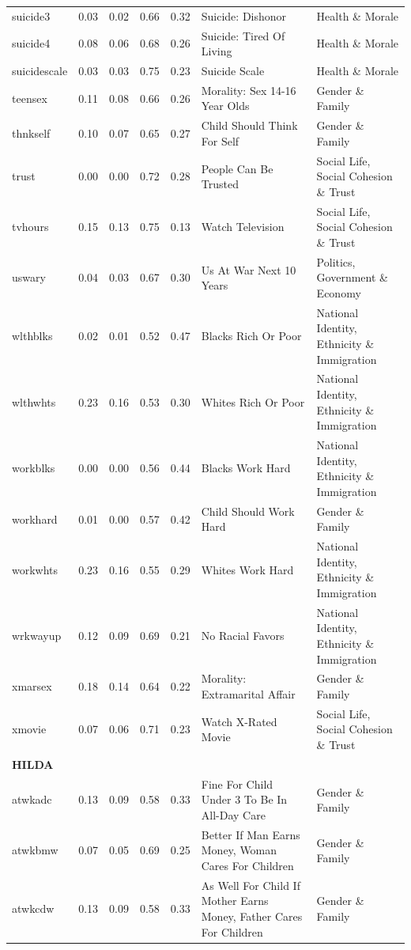 \documentclass[
  12pt,
]{article}
\begin{document}
\begin{landscape}
\begin{scriptsize}
\begin{longtable}{|p{1.75in}|p{0.3in}|p{0.3in}|p{0.3in}|p{0.3in}|p{2.5in}|p{2.5in}}
suicide3 & 0.03 & 0.02 & 0.66 & 0.32 & Suicide: Dishonor & Health \& Morale \\ 
suicide4 & 0.08 & 0.06 & 0.68 & 0.26 & Suicide: Tired Of Living & Health \& Morale \\ 
suicidescale & 0.03 & 0.03 & 0.75 & 0.23 & Suicide Scale & Health \& Morale \\ 
teensex & 0.11 & 0.08 & 0.66 & 0.26 & Morality: Sex 14-16 Year Olds & Gender \& Family \\ 
thnkself & 0.10 & 0.07 & 0.65 & 0.27 & Child Should Think For Self & Gender \& Family \\ 
trust & 0.00 & 0.00 & 0.72 & 0.28 & People Can Be Trusted & Social Life, Social Cohesion \& Trust \\ 
tvhours & 0.15 & 0.13 & 0.75 & 0.13 & Watch Television & Social Life, Social Cohesion \& Trust \\ 
uswary & 0.04 & 0.03 & 0.67 & 0.30 & Us At War Next 10 Years & Politics, Government \& Economy \\ 
wlthblks & 0.02 & 0.01 & 0.52 & 0.47 & Blacks Rich Or Poor & National Identity, Ethnicity \& Immigration \\ 
wlthwhts & 0.23 & 0.16 & 0.53 & 0.30 & Whites Rich Or Poor & National Identity, Ethnicity \& Immigration \\ 
workblks & 0.00 & 0.00 & 0.56 & 0.44 & Blacks Work Hard & National Identity, Ethnicity \& Immigration \\ 
workhard & 0.01 & 0.00 & 0.57 & 0.42 & Child Should Work Hard & Gender \& Family \\ 
workwhts & 0.23 & 0.16 & 0.55 & 0.29 & Whites Work Hard & National Identity, Ethnicity \& Immigration \\ 
wrkwayup & 0.12 & 0.09 & 0.69 & 0.21 & No Racial Favors & National Identity, Ethnicity \& Immigration \\ 
xmarsex & 0.18 & 0.14 & 0.64 & 0.22 & Morality: Extramarital Affair & Gender \& Family \\ 
xmovie & 0.07 & 0.06 & 0.71 & 0.23 & Watch X-Rated Movie & Social Life, Social Cohesion \& Trust \\ 
\midrule
\multicolumn{7}{l}{\textbf{HILDA}} \\ 
\midrule
atwkadc & 0.13 & 0.09 & 0.58 & 0.33 & Fine For Child Under 3 To Be In All-Day Care & Gender \& Family \\ 
atwkbmw & 0.07 & 0.05 & 0.69 & 0.25 & Better If Man Earns Money, Woman Cares For Children & Gender \& Family \\ 
atwkcdw & 0.13 & 0.09 & 0.58 & 0.33 & As Well For Child If Mother Earns Money, Father Cares For Children & Gender \& Family \\ 

\end{longtable}
\end{scriptsize}
\end{landscape}
\end{document}
